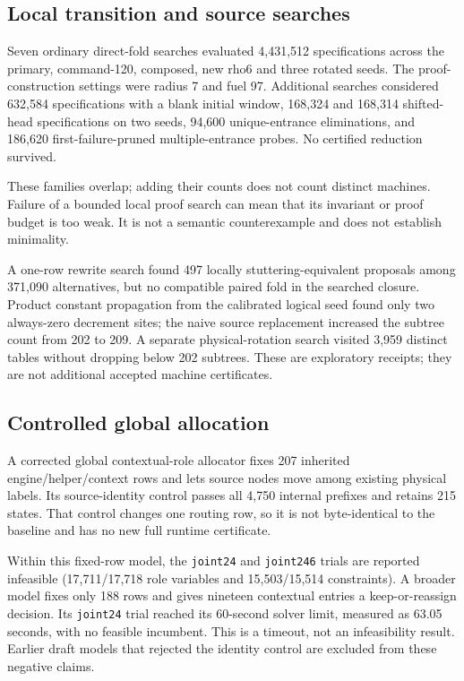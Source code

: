 \documentclass[11pt,a4paper]{article}
\theoremstyle{remark}\newtheorem{remark}[theorem]{Remark}
\begin{document}
\subsection{Local transition and source searches}

Seven ordinary direct-fold searches evaluated 4,431,512 specifications
across the primary, command-120, composed, new rho6 and three rotated
seeds. The proof-construction settings were radius 7 and fuel 97.
Additional searches considered 632,584 specifications with a blank
initial window, 168,324 and 168,314 shifted-head specifications on two
seeds, 94,600 unique-entrance eliminations, and 186,620
first-failure-pruned multiple-entrance probes.
No certified reduction survived.

These families overlap; adding their counts does not count distinct
machines. Failure of a bounded local proof search can mean that its
invariant or proof budget is too weak. It is not a semantic
counterexample and does not establish minimality.

A one-row rewrite search found 497 locally stuttering-equivalent
proposals among 371,090 alternatives, but no compatible paired fold
in the searched closure. Product constant propagation from the
calibrated logical seed found only two always-zero decrement sites;
the naive source replacement increased the subtree count from 202
to 209. A separate physical-rotation search visited 3,959 distinct
tables without dropping below 202 subtrees. These are exploratory
receipts; they are not additional accepted machine certificates.

\subsection{Controlled global allocation}

A corrected global contextual-role allocator fixes 207 inherited
engine/helper/context rows and lets source nodes move among existing
physical labels. Its source-identity control passes all 4,750
internal prefixes and retains 215 states. That control changes one
routing row, so it is not byte-identical to the baseline and has no
new full runtime certificate.

Within this fixed-row model, the \texttt{joint24} and
\texttt{joint246} trials are reported infeasible (17,711/17,718
role variables and 15,503/15,514 constraints). A broader model
fixes only 188 rows and gives nineteen contextual entries a
keep-or-reassign decision. Its \texttt{joint24} trial reached its
60-second solver limit, measured as 63.05 seconds, with no feasible
incumbent. This is a timeout, not an infeasibility result.
Earlier draft models that rejected the identity control are excluded
from these negative claims.
\end{document}
